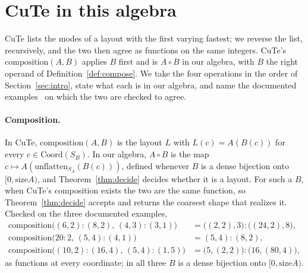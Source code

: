 \documentclass[11pt]{article}
\theoremstyle{definition}
\newcommand{\size}{\mathrm{size}}
\begin{document}
\section{CuTe in this algebra}\label{sec:cute}\label{sec:idioms}

CuTe lists the modes of a layout with the first varying fastest; we reverse
the list, recursively, and the two then agree as functions on the same
integers. CuTe's $\mathrm{composition}(A,B)$ applies $B$ first and is
$A \circ B$ in our algebra, with $B$ the right operand of
Definition~\ref{def:compose}. We take the four operations in the order of
Section~\ref{sec:intro}, state what each is in our algebra, and name the
documented examples~\cite{cutedocs} on which
the two are checked to agree.

\paragraph{Composition.} In CuTe, $\mathrm{composition}(A,B)$ is the layout
$L$ with $L(c) = A(B(c))$ for every $c \in \mathrm{Coord}(S_B)$. In our
algebra, $A \circ B$ is the map $c \mapsto A(\mathrm{unflatten}_{S_A}(B(c)))$, defined whenever $B$
is a dense bijection onto $[0,\size A)$, and Theorem~\ref{thm:decide} decides
whether it is a layout. For such a $B$, when CuTe's composition exists the
two are the same function, so Theorem~\ref{thm:decide} accepts and returns
the coarsest shape that realizes it. Checked on the three documented examples,
\begin{align*}
\mathrm{composition}\big((6,2){:}(8,2),\,(4,3){:}(3,1)\big)
  &= \big((2,2),3\big){:}\big((24,2),8\big),\\
\mathrm{composition}\big(20{:}2,\,(5,4){:}(4,1)\big) &= (5,4){:}(8,2),\\
\mathrm{composition}\big((10,2){:}(16,4),\,(5,4){:}(1,5)\big)
  &= \big(5,(2,2)\big){:}\big(16,(80,4)\big),
\end{align*}
as functions at every coordinate; in all three $B$ is a dense bijection onto
$[0,\size A)$.
\end{document}
